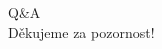 \documentclass[aspectratio=1610]{beamer}
\begin{document}







\begin{frame}{}
    \centering
    \huge Q\&A\\
    Děkujeme za pozornost!
\end{frame}
\end{document}
